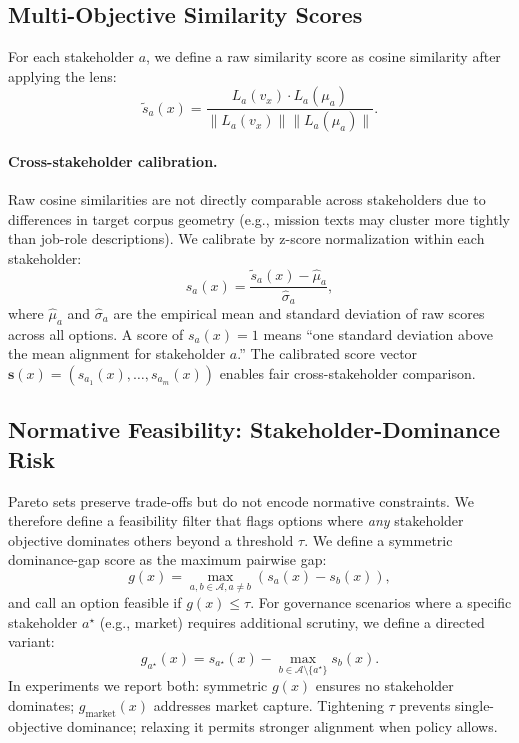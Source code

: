 \documentclass[sigconf,review]{acmart}
\begin{document}
\subsection{Multi-Objective Similarity Scores}
\label{subsec:scores}
For each stakeholder $a$, we define a raw similarity score as cosine similarity after applying the lens:
\begin{equation}
  \tilde{s}_a(x) = \frac{L_a(v_x) \cdot L_a(\mu_a)}{\|L_a(v_x)\| \|L_a(\mu_a)\|}.
\end{equation}
\paragraph{Cross-stakeholder calibration.}
Raw cosine similarities are not directly comparable across stakeholders due to differences in target corpus geometry (e.g., mission texts may cluster more tightly than job-role descriptions). We calibrate by z-score normalization within each stakeholder:
\begin{equation}
  s_a(x) = \frac{\tilde{s}_a(x) - \hat{\mu}_a}{\hat{\sigma}_a},
\end{equation}
where $\hat{\mu}_a$ and $\hat{\sigma}_a$ are the empirical mean and standard deviation of raw scores across all options. A score of $s_a(x) = 1$ means ``one standard deviation above the mean alignment for stakeholder $a$.''
The calibrated score vector $\mathbf{s}(x) = (s_{a_1}(x),\dots,s_{a_m}(x))$ enables fair cross-stakeholder comparison.

\subsection{Normative Feasibility: Stakeholder-Dominance Risk}
\label{subsec:constraint}
Pareto sets preserve trade-offs but do not encode normative constraints. We therefore define a feasibility filter that flags options where \emph{any} stakeholder objective dominates others beyond a threshold $\tau$.
We define a symmetric dominance-gap score as the maximum pairwise gap:
\begin{equation}
  g(x) = \max_{a,b \in \mathcal{A}, a \neq b} \left( s_a(x) - s_b(x) \right),
\end{equation}
and call an option feasible if $g(x) \le \tau$. For governance scenarios where a specific stakeholder $a^\star$ (e.g., market) requires additional scrutiny, we define a directed variant:
\begin{equation}
  g_{a^\star}(x) = s_{a^\star}(x) - \max_{b\in\mathcal{A}\setminus\{a^\star\}} s_b(x).
\end{equation}
In experiments we report both: symmetric $g(x)$ ensures no stakeholder dominates; $g_{\text{market}}(x)$ addresses market capture. Tightening $\tau$ prevents single-objective dominance; relaxing it permits stronger alignment when policy allows.
\end{document}
